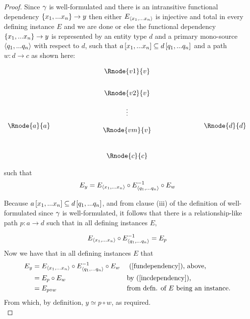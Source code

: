 \begin{proof}
Since $\gamma$ is well-formulated  and there is an intransitive functional dependency $\left\{x_1,...x_n\right\} \rightarrow y$ then either $E_{\langle x_1,...x_n\rangle}$ is injective and total in every defining instance $E$  and we are done or else the functional dependency
$\left\{x_1,...x_n\right\} \rightarrow y$   is represented 
by  an entity type $d$ and 
a primary mono-source $\langle q_1,...q_n\rangle$ with respect to
$d$, such that $a\left[x_1,...x_n\right]\subseteq d\left[q_1,...q_n\right]$ and a 
path $w:d\rightarrow c$ as shown here:

\setlength{\arraycolsep}{.2cm}
\begin{center}
$
\begin{array}{cp{2cm}c p{2cm} c}
             &  & \Rnode{v1}{\veee} & &               \\ [0.7cm]
						 &  & \Rnode{v2}{\veee} & &               \\ [0.4cm]
						 &  &     \vdots      & &               \\ [0.2cm]
\Rnode{a}{a} &  &                 & & \Rnode{d}{d}  \\ [-0.2cm]
             &  & \Rnode{vm}{\veee} & &               \\ [0.9cm]
             &  & \Rnode{c}{c}    & &               \\
\end{array}
$
\end{center}
such that
\begin{equation}
\label{fundependency}
E_y = E_{\langle x_1,...x_n\rangle} \circ E_{\langle q_1,...q_n\rangle}^{-1} \circ E_w
\end{equation}

Because $a\left[x_1,...x_n\right]\subseteq d\left[q_1,...q_n\right]$,  and from
clause (iii) of the definition of well-formulated since $\gamma$ is well-formulated, it follows that
there  is a relationship-like path $p:a \rightarrow d$ such
that 
in all defining instances $E$,

\begin{equation}
\label{incdependency}
E_{\langle x_1,...x_n\rangle} \circ E^{-1}_{\langle q_1,...q_n\rangle} = E_p
\end{equation}
Now we have  that in all defining instances $E$ that 
\begin{align*}
E_y &= E_{\langle x_1,...x_n\rangle} \circ E_{\langle q_1,...q_n\rangle}^{-1} \circ E_w  && \text{ (\ref{fundependency}), above,}\\
    &= E_p \circ E_w                                   && \text{by (\ref{incdependency}),}\\
		&= E_{p \circ w}                                   && \text{from defn. of $E$ being an instance.}\\
\end{align*} 
\vspace{-0.3cm}
From which, by definition, $y\simeq p \circ w$, as required. \\


\end{proof}
